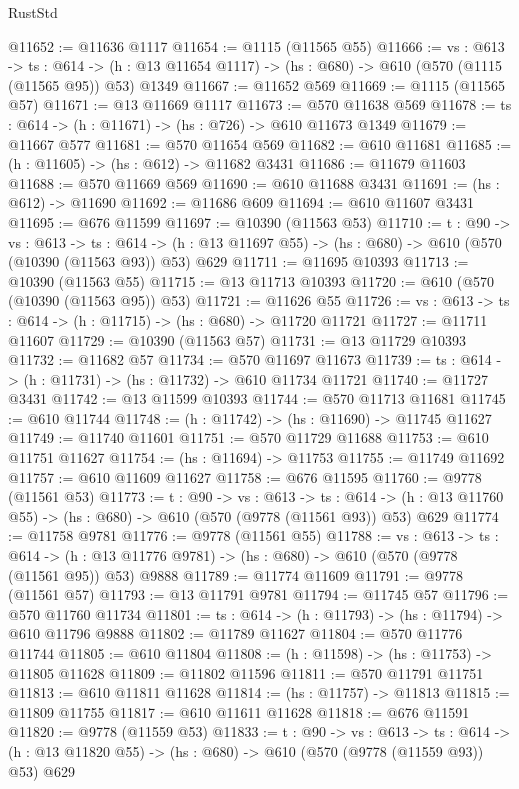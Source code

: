 \begin{lexlean}{RustStd}
\begin{coremodule}
@11652 := @11636 @1117
@11654 := @1115 (@11565 @55)
@11666 := {vs : @613} ->
  {ts : @614} -> (h : @13 @11654 @1117) -> (hs : @680) -> @610 (@570 (@1115 (@11565 @95)) @53) @1349
@11667 := @11652 @569
@11669 := @1115 (@11565 @57)
@11671 := @13 @11669 @1117
@11673 := @570 @11638 @569
@11678 := {ts : @614} -> (h : @11671) -> (hs : @726) -> @610 @11673 @1349
@11679 := @11667 @577
@11681 := @570 @11654 @569
@11682 := @610 @11681
@11685 := (h : @11605) -> (hs : @612) -> @11682 @3431
@11686 := @11679 @11603
@11688 := @570 @11669 @569
@11690 := @610 @11688 @3431
@11691 := (hs : @612) -> @11690
@11692 := @11686 @609
@11694 := @610 @11607 @3431
@11695 := @676 @11599
@11697 := @10390 (@11563 @53)
@11710 := {t : @90} ->
  {vs : @613} ->
  {ts : @614} -> (h : @13 @11697 @55) -> (hs : @680) -> @610 (@570 (@10390 (@11563 @93)) @53) @629
@11711 := @11695 @10393
@11713 := @10390 (@11563 @55)
@11715 := @13 @11713 @10393
@11720 := @610 (@570 (@10390 (@11563 @95)) @53)
@11721 := @11626 @55
@11726 := {vs : @613} -> {ts : @614} -> (h : @11715) -> (hs : @680) -> @11720 @11721
@11727 := @11711 @11607
@11729 := @10390 (@11563 @57)
@11731 := @13 @11729 @10393
@11732 := @11682 @57
@11734 := @570 @11697 @11673
@11739 := {ts : @614} -> (h : @11731) -> (hs : @11732) -> @610 @11734 @11721
@11740 := @11727 @3431
@11742 := @13 @11599 @10393
@11744 := @570 @11713 @11681
@11745 := @610 @11744
@11748 := (h : @11742) -> (hs : @11690) -> @11745 @11627
@11749 := @11740 @11601
@11751 := @570 @11729 @11688
@11753 := @610 @11751 @11627
@11754 := (hs : @11694) -> @11753
@11755 := @11749 @11692
@11757 := @610 @11609 @11627
@11758 := @676 @11595
@11760 := @9778 (@11561 @53)
@11773 := {t : @90} ->
  {vs : @613} ->
  {ts : @614} -> (h : @13 @11760 @55) -> (hs : @680) -> @610 (@570 (@9778 (@11561 @93)) @53) @629
@11774 := @11758 @9781
@11776 := @9778 (@11561 @55)
@11788 := {vs : @613} ->
  {ts : @614} -> (h : @13 @11776 @9781) -> (hs : @680) -> @610 (@570 (@9778 (@11561 @95)) @53) @9888
@11789 := @11774 @11609
@11791 := @9778 (@11561 @57)
@11793 := @13 @11791 @9781
@11794 := @11745 @57
@11796 := @570 @11760 @11734
@11801 := {ts : @614} -> (h : @11793) -> (hs : @11794) -> @610 @11796 @9888
@11802 := @11789 @11627
@11804 := @570 @11776 @11744
@11805 := @610 @11804
@11808 := (h : @11598) -> (hs : @11753) -> @11805 @11628
@11809 := @11802 @11596
@11811 := @570 @11791 @11751
@11813 := @610 @11811 @11628
@11814 := (hs : @11757) -> @11813
@11815 := @11809 @11755
@11817 := @610 @11611 @11628
@11818 := @676 @11591
@11820 := @9778 (@11559 @53)
@11833 := {t : @90} ->
  {vs : @613} ->
  {ts : @614} -> (h : @13 @11820 @55) -> (hs : @680) -> @610 (@570 (@9778 (@11559 @93)) @53) @629

\end{coremodule}
\end{lexlean}
